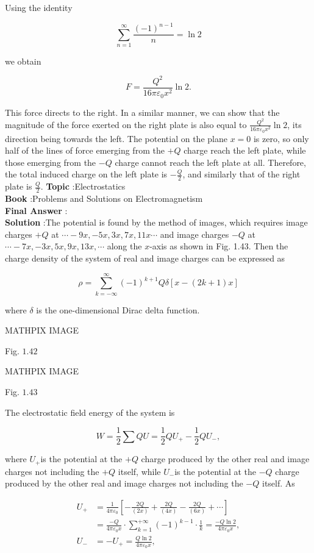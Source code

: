 \documentclass[10pt]{article}
\begin{document}
Using the identity

$$
\sum_{n=1}^{\infty} \frac{(-1)^{n-1}}{n}=\ln 2
$$

we obtain

$$
F=\frac{Q^{2}}{16 \pi \varepsilon_{0} x^{2}} \ln 2 .
$$

This force directs to the right. In a similar manner, we can show that the magnitude of the force exerted on the right plate is also equal to $\frac{Q^{2}}{16 \pi \varepsilon_{0} x^{2}} \ln 2$, its direction being towards the left.
 The potential on the plane $x=0$ is zero, so only half of the lines of force emerging from the $+Q$ charge reach the left plate, while those emerging from the $-Q$ charge cannot reach the left plate at all. Therefore, the total induced charge on the left plate is $-\frac{Q}{2}$, and similarly that of the right plate is $\frac{Q}{2}$.
\textbf{Topic} :Electrostatics\\
\textbf{Book} :Problems and Solutions on Electromagnetism\\
\textbf{Final Answer} : \\


\textbf{Solution} :The potential is found by the method of images, which requires image charges $+Q$ at $\cdots-9 x,-5 x, 3 x, 7 x, 11 x \cdots$ and image charges $-Q$ at $\cdots-7 x,-3 x, 5 x, 9 x, 13 x, \cdots$ along the $x$-axis as shown in Fig. 1.43. Then the charge density of the system of real and image charges can be expressed as

$$
\rho=\sum_{k=-\infty}^{\infty}(-1)^{k+1} Q \delta[x-(2 k+1) x]
$$

where $\delta$ is the one-dimensional Dirac delta function. 

MATHPIX IMAGE

Fig. $1.42$

MATHPIX IMAGE

Fig. $1.43$

The electrostatic field energy of the system is

$$
W=\frac{1}{2} \sum Q U=\frac{1}{2} Q U_{+}-\frac{1}{2} Q U_{-},
$$

where $U_{+}$is the potential at the $+Q$ charge produced by the other real and image charges not including the $+Q$ itself, while $U_{-}$is the potential at the $-Q$ charge produced by the other real and image charges not including the $-Q$ itself. As

$$
\begin{aligned}
U_{+} &=\frac{1}{4 \pi \varepsilon_{0}}\left[-\frac{2 Q}{(2 x)}+\frac{2 Q}{(4 x)}-\frac{2 Q}{(6 x)}+\cdots\right] \\
&=\frac{-Q}{4 \pi \varepsilon_{0} x} \cdot \sum_{k=1}^{+\infty}(-1)^{k-1} \cdot \frac{1}{k}=\frac{-Q \ln 2}{4 \pi \varepsilon_{0} x}, \\
U_{-} &=-U_{+}=\frac{Q \ln 2}{4 \pi \varepsilon_{0} x},
\end{aligned}
$$
\end{document}
